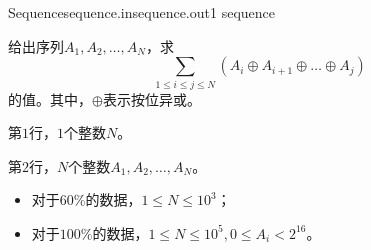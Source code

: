 \documentclass[11pt,a4paper,oneside]{article}
\begin{document}
\begin{problem}{Sequence}{sequence.in}{sequence.out}{1 sequence}

    给出序列$A_1, A_2, \dots, A_N$，求$$\sum_{1 \leq i \leq j \leq N}(A_i \oplus A_{i + 1} \oplus \dots \oplus A_j)$$的值。其中，$\oplus$表示按位异或。

    \InputFile

    第$1$行，$1$个整数$N$。

    第$2$行，$N$个整数$A_1, A_2, \dots, A_N$。

    \OutputFile

    \Example

    \begin{example}
    \end{example}

    \Note
    \begin{itemize}
        \item 对于$60\%$的数据，$1 \leq N \leq 10^3$；

        \item 对于$100\%$的数据，$1 \leq N \leq 10^5, 0 \leq A_i < 2^{16}$。
    \end{itemize}

\end{problem}
\end{document}
